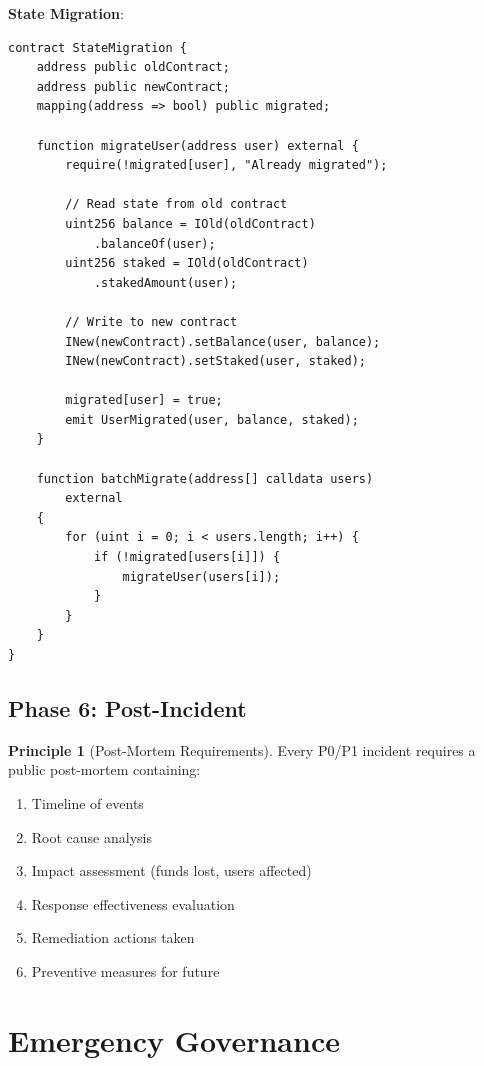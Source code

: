 \documentclass[11pt,a4paper]{article}
\theoremstyle{definition}
\newtheorem{principle}{Principle}
\begin{document}
\textbf{State Migration}:
\begin{lstlisting}[language=Solidity,basicstyle=\ttfamily\small]
contract StateMigration {
    address public oldContract;
    address public newContract;
    mapping(address => bool) public migrated;

    function migrateUser(address user) external {
        require(!migrated[user], "Already migrated");

        // Read state from old contract
        uint256 balance = IOld(oldContract)
            .balanceOf(user);
        uint256 staked = IOld(oldContract)
            .stakedAmount(user);

        // Write to new contract
        INew(newContract).setBalance(user, balance);
        INew(newContract).setStaked(user, staked);

        migrated[user] = true;
        emit UserMigrated(user, balance, staked);
    }

    function batchMigrate(address[] calldata users)
        external
    {
        for (uint i = 0; i < users.length; i++) {
            if (!migrated[users[i]]) {
                migrateUser(users[i]);
            }
        }
    }
}
\end{lstlisting}

\subsection{Phase 6: Post-Incident}

\begin{principle}[Post-Mortem Requirements]
Every P0/P1 incident requires a public post-mortem containing:
\begin{enumerate}
    \item Timeline of events
    \item Root cause analysis
    \item Impact assessment (funds lost, users affected)
    \item Response effectiveness evaluation
    \item Remediation actions taken
    \item Preventive measures for future
\end{enumerate}
\end{principle}

\section{Emergency Governance}
\end{document}
